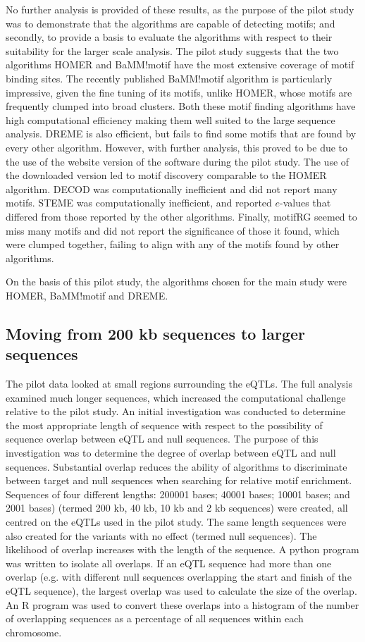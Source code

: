 \documentclass[12pt]{article}
\begin{document}
No further analysis is provided of these results, as the purpose of the pilot study was to demonstrate that the algorithms are capable of detecting motifs; and secondly, to provide a basis to evaluate the algorithms with respect to their suitability for the larger scale analysis.
\newpage
The pilot study suggests that the two algorithms HOMER and BaMM!motif  have the most extensive coverage of motif binding sites. The recently published BaMM!motif algorithm is particularly impressive, given the fine tuning of its motifs, unlike HOMER, whose motifs are frequently clumped into broad clusters. Both these motif finding algorithms have high computational efficiency making them well suited to the large sequence analysis. DREME is also 
efficient, but fails to find some motifs that are found by every other algorithm. However, with further analysis, this proved to be due to the use of the website version of the software during the pilot study. The use of the downloaded version led to motif discovery comparable to the HOMER algorithm. DECOD was computationally inefficient and did not report many motifs. STEME was computationally inefficient, and reported $e$-values that differed from those reported by the other algorithms. Finally, motifRG seemed to miss many motifs and did not report the significance of those it found, which were clumped together, failing to align with any of the motifs found by other algorithms. 

On the basis of this pilot study, the algorithms chosen for the main study were HOMER, BaMM!motif and DREME.


\subsection{Moving from 200 kb sequences to larger sequences}

The pilot data looked at small regions surrounding the eQTLs. The full analysis examined much longer sequences, which increased the computational challenge relative to the pilot study.  An initial investigation was conducted to determine the most appropriate length of sequence with respect to the possibility of sequence overlap between eQTL and null sequences. The purpose of this investigation was to determine the degree of overlap between eQTL and null sequences. Substantial overlap reduces the ability of algorithms to discriminate between target and null sequences when searching for relative motif enrichment. Sequences of four different lengths: 200001 bases; 40001 bases; 10001 bases; and 2001 bases) (termed 200 kb, 40 kb, 10 kb and 2 kb sequences) were created, all centred on the eQTLs used in the pilot study. The same length sequences were also created for the variants with no effect (termed null sequences). The likelihood of overlap increases with the length of the sequence. A python program was written to isolate all overlaps. If an eQTL sequence had more than one overlap (e.g. with different null sequences overlapping the start and finish of the eQTL sequence), the largest overlap was used to calculate the size of the overlap. An R program was used to convert these overlaps into a histogram of the number of overlapping sequences as a percentage of all sequences within each chromosome.
\end{document}
